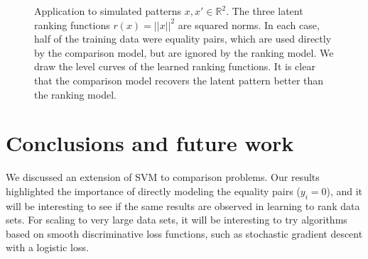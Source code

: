 \documentclass{article}
\newcommand{\RR}{\mathbb R}
\begin{document}
\begin{figure}[b!]
  \centering
  
  \vskip -0.5cm
  \caption{Application to simulated patterns $x,x'\in\RR^2$. The three
    latent ranking functions $r(x)=||x||^2$ are squared norms. In each
    case, half of the training data were equality pairs, which are
    used directly by the comparison model, but are ignored by the
    ranking model.  We draw the level curves of the learned ranking
    functions.  It is clear that the comparison model recovers the
    latent pattern better than the ranking model.}
  \label{fig:norms}
\end{figure}


\section{Conclusions and future work}
\label{sec:conclusions}

We discussed an extension of SVM to comparison problems. Our results
highlighted the importance of directly modeling the equality pairs
($y_i=0$), and it will be interesting to see if the same results are
observed in learning to rank data sets. For scaling to very large data
sets, it will be interesting to try algorithms based on smooth
discriminative loss functions, such as stochastic gradient descent
with a logistic loss.



\end{document}
